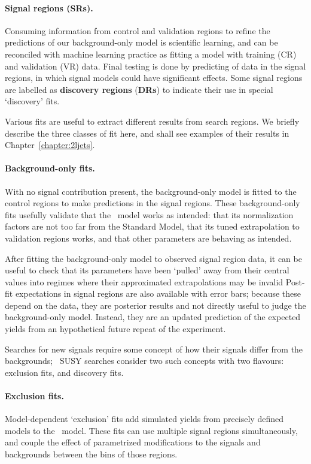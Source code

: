 \paragraph{Signal regions (SRs).}
Consuming information from control and validation regions to refine the
predictions of our background-only model is scientific learning, and can be
reconciled with machine learning practice as fitting a model with training
(CR) and validation (VR) data.
Final testing is done by predicting of data in the signal regions, in which
signal models could have significant effects.
Some signal regions are labelled as \textbf{discovery regions} (\textbf{DRs})
to indicate their use in special `discovery' fits.

Various fits are useful to extract different results from search regions.
We briefly describe the three classes of fit here, and shall see examples
of their results in Chapter~\ref{chapter:2ljets}.

\paragraph{Background-only fits.}
With no signal contribution present, the background-only model is fitted
to the control regions to make predictions in the signal regions.
These background-only fits usefully validate that the \heplikelihood\ model
works as intended: that its normalization factors are not too far from the
Standard Model, that its tuned extrapolation to validation regions works,
and that other parameters are behaving as intended.

After fitting the background-only model to observed signal region data,
it can be useful to check that its parameters have been `pulled' away from
their central values into regimes where their approximated extrapolations may
be invalid
Post-fit expectations in signal regions are also available with error bars;
because these depend on the data, they are posterior results and not directly
useful to judge the background-only model.
Instead, they are an updated prediction of the expected yields from an
hypothetical future repeat of the experiment.

Searches for new signals require some concept of how their signals differ
from the backgrounds;
\atlas\ SUSY searches consider two such concepts with two flavours:
exclusion fits, and discovery fits.

\paragraph{Exclusion fits.}
Model-dependent `exclusion' fits add simulated yields from precisely
defined models to the \heplikelihood\ model.
These fits can use multiple signal regions simultaneously, and couple the
effect of parametrized modifications to the signals and backgrounds between
the bins of those regions.


